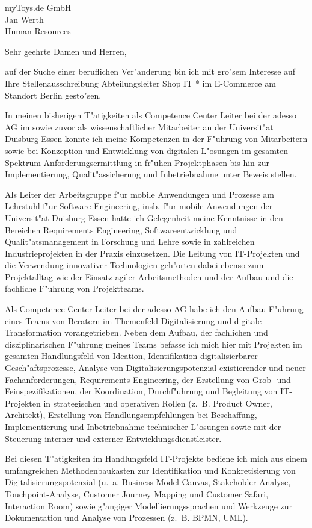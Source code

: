 \documentclass[10pt,a4paper]{dinbrief}
\date{\today}
\begin{document}
 
\begin{letter}  
{%
	myToys.de GmbH\\
	Jan Werth\\
	Human Resources
}
\subject{\bf Bewerbung Abteilungsleiter Shop IT * im E-Commerce}
\opening{Sehr geehrte Damen und Herren,}
auf der Suche einer beruflichen Ver"anderung bin ich mit gro"sem Interesse auf Ihre Stellenausschreibung Abteilungsleiter Shop IT * im E-Commerce am Standort Berlin  gesto"sen. 

In meinen bisherigen T"atigkeiten als Competence Center Leiter bei der adesso AG im sowie zuvor als wissenschaftlicher Mitarbeiter an der Universit"at Duisburg-Essen konnte ich meine Kompetenzen in der F"uhrung von Mitarbeitern sowie bei Konzeption und Entwicklung von digitalen L"osungen im gesamten Spektrum Anforderungsermittlung in fr"uhen Projektphasen bis hin zur Implementierung, Qualit"assicherung und Inbetriebnahme unter Beweis stellen.

Als Leiter der Arbeitsgruppe f"ur mobile Anwendungen und Prozesse am Lehrstuhl f"ur Software Engineering, insb. f"ur mobile Anwendungen der Universit"at Duisburg-Essen hatte ich Gelegenheit meine Kenntnisse in den Bereichen Requirements Engineering, Softwareentwicklung  und Qualit"atsmanagement in Forschung und Lehre sowie in zahlreichen Industrieprojekten in der Praxis einzusetzen. Die Leitung von IT-Projekten und die Verwendung innovativer Technologien geh"orten dabei ebenso zum Projektalltag wie der Einsatz agiler Arbeitsmethoden und der Aufbau und die fachliche  F"uhrung von Projektteams.

Als Competence Center Leiter bei der adesso AG habe ich den Aufbau F"uhrung eines Teams von Beratern im Themenfeld Digitalisierung und digitale Transformation vorangetrieben. Neben dem Aufbau, der fachlichen und disziplinarischen F"uhrung meines Teams befasse ich mich hier mit Projekten im gesamten Handlungsfeld von Ideation, Identifikation digitalisierbarer Gesch"aftsprozesse, Analyse von Digitalisierungspotenzial existierender und neuer Fachanforderungen, Requirements Engineering, der Erstellung von Grob- und Feinspezifikationen, der Koordination, Durchf"uhrung und Begleitung von IT-Projekten in strategischen und operativen Rollen (z.~B. Product Owner, Architekt), Erstellung von Handlungsempfehlungen bei Beschaffung, Implementierung und Inbetriebnahme technischer L"osungen sowie mit der Steuerung interner und externer Entwicklungsdienstleister.\clearpage

Bei diesen T"atigkeiten im Handlungsfeld IT-Projekte bediene ich mich aus einem umfangreichen Methodenbaukasten zur Identifikation und Konkretisierung von Digitalisierungspotenzial (u.~a. Business Model Canvas, Stakeholder-Analyse, Touchpoint-Analyse, Customer Journey Mapping und Customer Safari, Interaction Room) sowie g"angiger Modellierungssprachen und Werkzeuge zur Dokumentation und Analyse von Prozessen (z.~B. BPMN, UML).


\end{letter}
\end{document}
